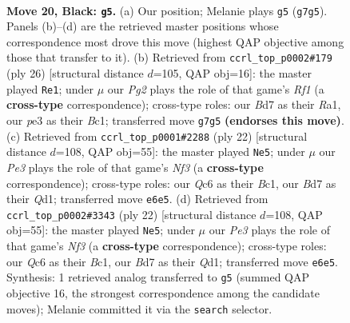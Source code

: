 \documentclass[11pt]{article}
\begin{document}
\clearpage

\begin{figure}[p]\centering
\begin{subfigure}{0.46\textwidth}\centering
\resizebox{\linewidth}{!}{%
\newchessgame
\chessboard[
  setfen={1nr2bk1/rp1b1pp1/p1q1pn2/B6p/7N/3BP1N1/PP3PPP/R2QR1K1 b - - 3 20},
  showmover=false,
  pgfstyle=straightmove, color=movearrow, markmove={g7-g5}
]}
\caption{}
\end{subfigure}\hfill
\begin{subfigure}{0.46\textwidth}\centering
\resizebox{\linewidth}{!}{%
\newchessgame
\chessboard[
  setfen={r2q1rk1/pp1bppbp/1n4p1/n2P4/6P1/1BN2N1P/PP3P2/R1BQ1RK1 w - - 1 14},
  showmover=false,
  pgfstyle=straightmove, color=movearrow, markmove={f1-e1}
]}
\caption{}
\end{subfigure}
\\[4pt]
\begin{subfigure}{0.46\textwidth}\centering
\resizebox{\linewidth}{!}{%
\newchessgame
\chessboard[
  setfen={r1bq1rk1/pp3pp1/2nbpn1p/8/3P4/1BN2N2/PP3PPP/R1BQR1K1 w - - 2 12},
  showmover=false,
  pgfstyle=straightmove, color=movearrow, markmove={f3-e5}
]}
\caption{}
\end{subfigure}\hfill
\begin{subfigure}{0.46\textwidth}\centering
\resizebox{\linewidth}{!}{%
\newchessgame
\chessboard[
  setfen={r1bq1rk1/pp3pp1/2nbpn1p/8/3P4/1BN2N2/PP3PPP/R1BQR1K1 w - - 2 12},
  showmover=false,
  pgfstyle=straightmove, color=movearrow, markmove={f3-e5}
]}
\caption{}
\end{subfigure}
\caption{\textbf{Move 20, Black: \texttt{g5}.} (a) Our position; Melanie plays \texttt{g5} (\texttt{g7g5}). Panels (b)--(d) are the retrieved master positions whose correspondence most drove this move (highest QAP objective among those that transfer to it). (b) Retrieved from \texttt{ccrl\_top\_p0002\#179} (ply 26) [structural distance $d$=105, QAP obj=16]: the master played \texttt{Re1}; under $\mu$ our \emph{Pg2} plays the role of that game's \emph{Rf1} (a \textbf{cross-type} correspondence); cross-type roles: our \emph{B}d7 as their \emph{R}a1, our \emph{p}e3 as their \emph{B}c1; transferred move \texttt{g7g5} \textbf{(endorses this move)}. (c) Retrieved from \texttt{ccrl\_top\_p0001\#2288} (ply 22) [structural distance $d$=108, QAP obj=55]: the master played \texttt{Ne5}; under $\mu$ our \emph{Pe3} plays the role of that game's \emph{Nf3} (a \textbf{cross-type} correspondence); cross-type roles: our \emph{Q}c6 as their \emph{B}c1, our \emph{B}d7 as their \emph{Q}d1; transferred move \texttt{e6e5}. (d) Retrieved from \texttt{ccrl\_top\_p0002\#3343} (ply 22) [structural distance $d$=108, QAP obj=55]: the master played \texttt{Ne5}; under $\mu$ our \emph{Pe3} plays the role of that game's \emph{Nf3} (a \textbf{cross-type} correspondence); cross-type roles: our \emph{Q}c6 as their \emph{B}c1, our \emph{B}d7 as their \emph{Q}d1; transferred move \texttt{e6e5}. Synthesis: 1 retrieved analog transferred to \texttt{g5} (summed QAP objective 16, the strongest correspondence among the candidate moves); Melanie committed it via the \texttt{search} selector.}
\label{fig:thought-m39}
\end{figure}
\end{document}
